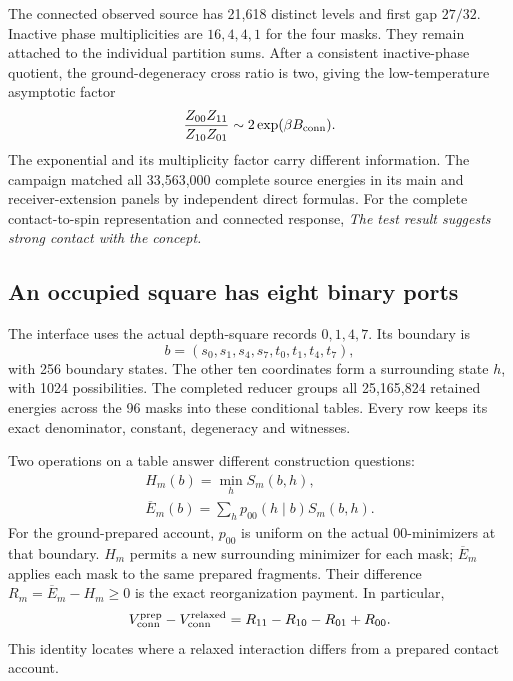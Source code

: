 The connected observed source has 21,618 distinct levels and first gap
\(27/32\). Inactive phase multiplicities are \(16,4,4,1\) for the four
masks. They remain attached to the individual partition sums. After a
consistent inactive-phase quotient, the ground-degeneracy cross ratio is
two, giving the low-temperature asymptotic factor
\[
 \frac{Z_{00}Z_{11}}{Z_{10}Z_{01}}
 \sim 2\exp(\beta B_{\rm conn}).
\]
The exponential and its multiplicity factor carry different information.
The campaign matched all 33,563,000 complete source energies in its main
and receiver-extension panels by independent direct formulas. For the
complete contact-to-spin representation and connected response,
\emph{The test result suggests strong contact with the concept.}

\subsection{An occupied square has eight binary ports}

The interface uses the actual depth-square records \(0,1,4,7\). Its boundary is
\[
 b=(s_0,s_1,s_4,s_7,t_0,t_1,t_4,t_7),
\]
with 256 boundary states. The other ten coordinates form a surrounding state
\(h\), with 1024 possibilities. The completed reducer groups all 25,165,824
retained energies across the 96 masks into these conditional tables.
Every row keeps its exact denominator, constant, degeneracy and witnesses.

Two operations on a table answer different construction questions:
\[
\begin{gathered}
H_m(b)=\min_h S_m(b,h),\\
 \overline E_m(b)=\sum_h p_{00}(h\mid b)S_m(b,h).
\end{gathered}
\]
For the ground-prepared account, \(p_{00}\) is uniform on the actual
\(00\)-minimizers at that boundary. \(H_m\) permits a new surrounding
minimizer for each mask; \(\overline E_m\) applies each mask to the same
prepared fragments. Their difference
\(R_m=\overline E_m-H_m\geq0\) is the exact reorganization payment.
In particular,
\[
 V_{\rm conn}^{\rm prep}-V_{\rm conn}^{\rm relaxed}
       =R_{11}-R_{10}-R_{01}+R_{00}.
\]
This identity locates where a relaxed interaction differs from a prepared
contact account.

